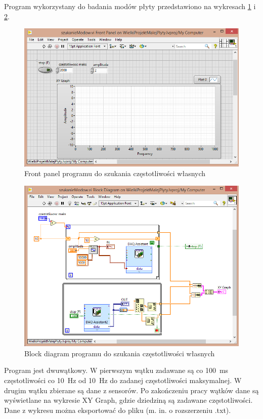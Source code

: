 \documentclass[polish,a4paper,11pt]{mwart}
\begin{document}
Program wykorzystany do badania modów płyty przedstawiono na wykresach
\ref{fig:eigen_front} i \ref{fig:eigen_block}.

\begin{figure}[!tbh]
  \centering
  \includegraphics[width=\textwidth]{bitgraphics/panel_front_mod.png}
  \caption{Front panel programu do szukania częstotliwości własnych}
  \label{fig:eigen_front}
\end{figure}

\begin{figure}[!tbh]
  \centering
  \includegraphics[width=\textwidth]{bitgraphics/panel_back_mod.png}
  \caption{Block diagram programu do szukania częstotliwości własnych}
  \label{fig:eigen_block}
\end{figure}

Program jest dwuwątkowy. W pierwszym wątku zadawane są co
\SI{100}{\milli\second} częstotliwości co \SI{10}{\hertz} od \SI{10}{\hertz} do
zadanej częstotliwości maksymalnej.  W drugim wątku zbierane są dane z
sensorów. Po zakończeniu pracy wątków dane są wyświetlane na wykresie XY Graph,
gdzie dziedziną są zadawane częstotliwości.  Dane z wykresu można eksportować
do pliku (m. in. o rozszerzeniu .txt).
\end{document}
